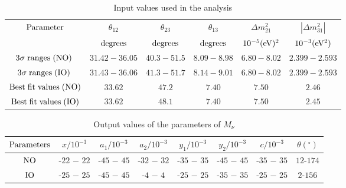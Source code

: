 \documentclass[11pt]{article}
\begin{document}
\begin{table}[H]
\begin{center}
\caption{Input values used in the analysis\cite{Esteban:2016qun}} \label{oscx}
 \begin{tabular}{|c|c|c|c|c|c|} 
\hline 
${\rm Parameter}$&$\theta_{12}$&$\theta_{23}$ &$\theta_{13}$ &$ \Delta m_{21}^2$&$|\Delta m_{31}^2|$\\
&$\rm degrees$&$\rm degrees$ &$\rm degrees$ &$ 10^{-5}\rm (eV)^2$&$10^{-3} \rm (eV^2)$\\
\hline
$3\sigma\hspace{1mm}{\rm ranges\hspace{1mm}(NO)\hspace{1mm}}$&$31.42-36.05$&$40.3-51.5$&$8.09-8.98$&
$6.80-8.02$&$2.399-2.593$\\
\hline
$3\sigma\hspace{1mm}{\rm ranges\hspace{1mm}(IO)\hspace{1mm}}$&$31.43-36.06$&$41.3-51.7$&$8.14-9.01$&
$6.80-8.02$&$2.399-2.593$\\
\hline
${\rm Best\hspace{1mm}{\rm fit\hspace{1mm}}values\hspace{1mm}(NO)}$ & $33.62$ & $47.2$ &  $7.40$ &$7.50$ & $2.46$\\
\hline
${\rm Best\hspace{1mm}{\rm fit\hspace{1mm}}values\hspace{1mm}(IO)}$&$33.62$&$48.1$&$7.40$&$7.50$&$2.45$\\
\hline
\end{tabular} 
\end{center} 
\end{table}
\noindent  

\begin{table}[H]
\begin{center}
\caption{Output values of the parameters of $M_\nu$} \label{osc2}
 \begin{tabular}{|c|c|c|c|c|c|c|c|} 
\hline 
${\rm Parameters}$& $x/10^{-3}$&$a_1/10^{-3}$ &$a_2/10^{-3}$ &$y_1/10^{-3}$&$y_2/10^{-3}$&$c/10^{-3}$ & $\theta (^\circ)$\\
\hline
${\rm NO}$& -$22$ $-$ $22$&-$45$ $-$ $45$&-$32$ $-$ $32$&-$35$ $-$ $35$&-$45$ $-$ $45$
&-$35$ $-$ $35$ & $12$-$174$\\
\hline
${\rm IO}$&-$25$ $-$ $25$&-$45$ $-$ $45$&-$4$ $-$ $4$&-$25$ $-$ $25$&-$35$ $-$ $35$
&-$25$ $-$ $25$& $2$-$156$\\
\hline
\end{tabular} 
\end{center} 
\end{table}
\noindent 
\end{document}
